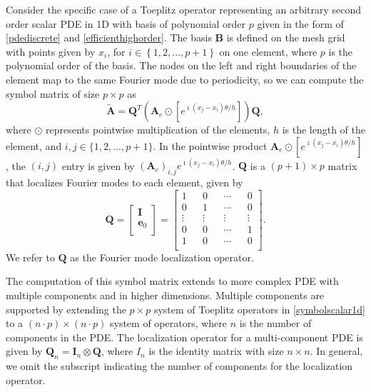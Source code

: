 \documentclass[review]{siamart190516}
\begin{document}
Consider the specific case of a Toeplitz operator representing an arbitrary second order scalar PDE in 1D with basis of polynomial order $p$ given in the form of \cref{pdediscrete} and \cref{efficienthighorder}.
The basis $\mathbf{B}$ is defined on the mesh grid with points given by $x_i$, for $i \in \left\lbrace 1, 2, \dots, p + 1 \right\rbrace$ on one element, where $p$ is the polynomial order of the basis.
The nodes on the left and right boundaries of the element map to the same Fourier mode due to periodicity, so we can compute the symbol matrix of size $p \times p$ as
\begin{equation}\label{symbolscalar1d}
\tilde{\mathbf{A}} = \mathbf{Q}^T \left( \mathbf{A}_e \odot \left[ e^{\imath \left( x_j - x_i \right) \theta / h} \right] \right) \mathbf{Q},
\end{equation}
where $\odot$ represents pointwise multiplication of the elements, $h$ is the length of the element, and $i, j \in \lbrace 1, 2, \dots, p + 1 \rbrace$.
In the pointwise product $\mathbf{A}_e \odot \left[ e^{\imath \left( x_j - x_i \right) \theta / h} \right]$, the $\left( i, j \right)$ entry is given by $\left( \mathbf{A}_e \right)_{i, j} e^{\imath \left( x_j - x_i \right) \theta / h}$.
$\mathbf{Q}$ is a $\left( p + 1 \right) \times p$ matrix that localizes Fourier modes to each element, given by
\begin{equation}
\mathbf{Q} =
\begin{bmatrix}
    \mathbf{I}   \\
    \mathbf{e}_0 \\
\end{bmatrix} =
\begin{bmatrix}
    1      && 0      && \cdots && 0      \\
    0      && 1      && \cdots && 0      \\
    \vdots && \vdots && \vdots && \vdots \\
    0      && 0      && \cdots && 1      \\
    1      && 0      && \cdots && 0      \\
\end{bmatrix}.
\end{equation}
We refer to $\mathbf{Q}$ as the Fourier mode localization operator.

The computation of this symbol matrix extends to more complex PDE with multiple components and in higher dimensions.
Multiple components are supported by extending the $p \times p$ system of Toeplitz operators in \cref{symbolscalar1d} to a $\left( n \cdot p \right) \times \left( n \cdot p \right)$ system of operators, where $n$ is the number of components in the PDE.
The localization operator for a multi-component PDE is given by $\mathbf{Q}_n = \mathbf{I}_n \otimes \mathbf{Q}$, where $I_n$ is the identity matrix with size $n \times n$.
In general, we omit the subscript indicating the number of components for the localization operator.
\end{document}
